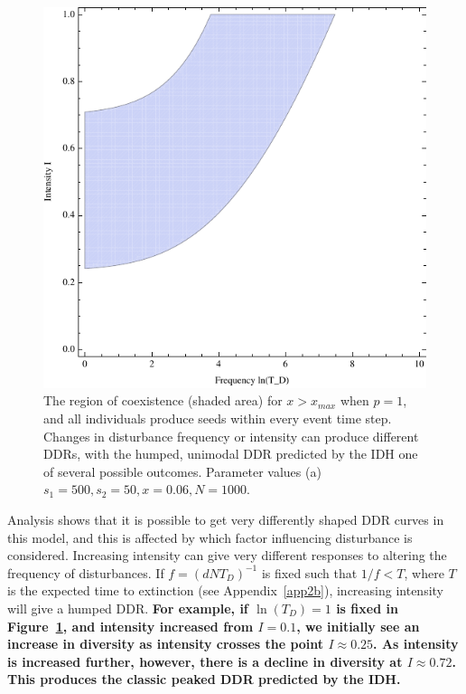 \begin{figure}[th]
\centering
  \includegraphics[width=5in]{hockeyTd.pdf}
   \caption[Coexistence with disturbance]{The region of coexistence (shaded area) for $x>x_{max}$ when $p=1$, and all individuals produce seeds within every event time step. Changes in disturbance frequency or intensity can produce different DDRs, with the humped, unimodal DDR predicted by the IDH one of several possible outcomes. Parameter values (a) $s_1=500, s_2=50, x=0.06,N=1000$.}
 \label{hockey}
\end{figure}

Analysis shows that it is possible to get very differently shaped DDR curves in this model, and this is affected by which factor influencing disturbance is considered. Increasing intensity can give very different responses to altering the frequency of disturbances. If $f=(dNT_D)^{-1}$ is fixed such that $1/f<T$, where $T$ is the expected time to extinction (see Appendix~\ref{app2b}), increasing intensity will give a humped DDR. \textbf{For example, if $\ln(T_D)=1$ is fixed in Figure~\ref{hockey}, and intensity increased from $I=0.1$, we initially see an increase in diversity as intensity crosses the point $I\approx0.25$. As intensity is increased further, however, there is a decline in diversity at $I\approx0.72$. This produces the classic peaked DDR predicted by the IDH.} 


